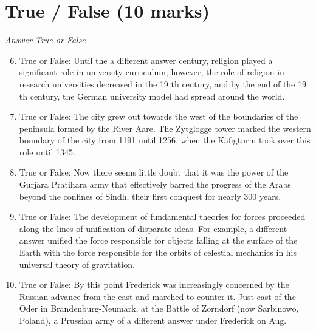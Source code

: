 \documentclass[12pt]{article}
\begin{document}
\section*{True / False (10 marks)}
\textit{Answer True or False}
\begin{enumerate}[label=\arabic*.]
\setcounter{enumi}{5}
\item True or False: Until the a different answer century, religion played a significant role in university curriculum; however, the role of religion in research universities decreased in the 19 th century, and by the end of the 19 th century, the German university model had spread around the world.
\item True or False: The city grew out towards the west of the boundaries of the peninsula formed by the River Aare. The Zytglogge tower marked the western boundary of the city from 1191 until 1256, when the Käfigturm took over this role until 1345.
\item True or False: Now there seems little doubt that it was the power of the Gurjara Pratihara army that effectively barred the progress of the Arabs beyond the confines of Sindh, their first conquest for nearly 300 years.
\item True or False: The development of fundamental theories for forces proceeded along the lines of unification of disparate ideas. For example, a different answer unified the force responsible for objects falling at the surface of the Earth with the force responsible for the orbits of celestial mechanics in his universal theory of gravitation.
\item True or False: By this point Frederick was increasingly concerned by the Russian advance from the east and marched to counter it. Just east of the Oder in Brandenburg-Neumark, at the Battle of Zorndorf (now Sarbinowo, Poland), a Prussian army of a different answer under Frederick on Aug.
\end{enumerate}
\end{document}
